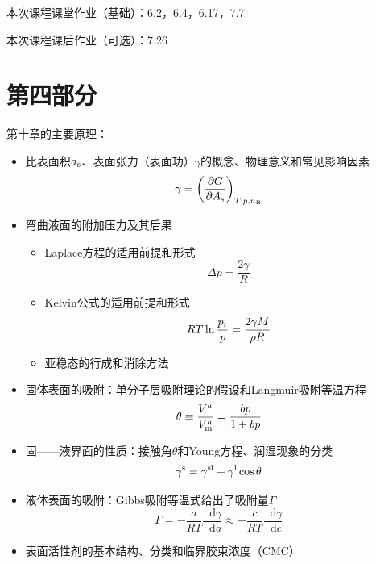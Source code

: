 \documentclass[9pt]{beamer}
\newcommand\B{{\rm B}}
\newcommand*{\dif}{\mathop{}\!\mathrm{d}}
\newcommand\m{{\rm m}}
\newcommand\rr{{\rm r}}
\newcommand{\s}{{\rm s}}
\begin{document}
	\begin{frame}
	
	本次课程课堂作业（基础）：6.2，6.4，6.17，7.7
	
	\hspace*{\fill}	
	
	本次课程课后作业（可选）：7.26
	
	\end{frame}		
	
	\section{第四部分}	
	
	\begin{frame}
	
	第十章的主要原理：
	
	\begin{itemize}
	
	\item 比表面积$a_\s$、表面张力（表面功）$\gamma$的概念、物理意义和常见影响因素
	\[
		\gamma = \left( \frac{ \partial G }{ \partial A_\s } \right)_{T,p,n_\B}
	\]
	
	\item 弯曲液面的附加压力及其后果
		\begin{itemize}
	
		\item Laplace方程的适用前提和形式
		\[
			\Delta p = \frac{ 2\gamma }{ R }
		\]
		
		\item Kelvin公式的适用前提和形式
		\[
			RT \ln{ \frac{ p_\rr }{ p } } = \frac{ 2 \gamma M }{ \rho R }
		\]
		
		\item 亚稳态的行成和消除方法
	
		\end{itemize}
	
	\item 固体表面的吸附：单分子层吸附理论的假设和Langmuir吸附等温方程
	\[
		\theta \equiv \frac{ V^a }{ V^a_\m } = \frac{ bp }{ 1 + bp }
	\]
	
	\end{itemize}
	
	\end{frame}
	
	\begin{frame}
	
	\begin{itemize}
	
	\item 固——液界面的性质：接触角$\theta$和Young方程、润湿现象的分类
	\[
		\gamma^{\rm s} = \gamma^{\rm sl} + \gamma^{\rm l} \cos{ \theta }
	\]
	
	\item 液体表面的吸附：Gibbs吸附等温式给出了吸附量$\varGamma$
	\[
		\varGamma = - \frac{ a }{ RT } \frac{ \dif \gamma }{ \dif a } \approx - \frac{ c }{ RT } \frac{ \dif \gamma }{ \dif c } 
	\]	
	
	\item 表面活性剂的基本结构、分类和临界胶束浓度（CMC）
	
	\end{itemize}		
	
	\end{frame}
	
\end{document}
